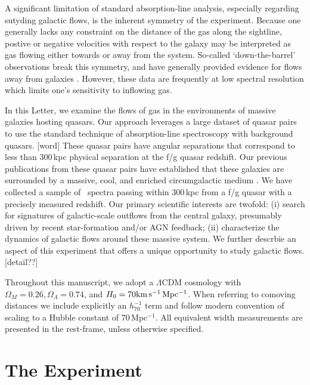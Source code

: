 \documentclass[12pt,preprint]{aastex}
\begin{document}
A significant limitation of standard absorption-line
analysis, especially regarding sutyding galactic flows,
is the inherent symmetry of the experiment.
Because one generally lacks any constraint on the distance
of the gas along the sightline,
postive or negative velocities with respect to the
galaxy may be interpreted as gas flowing either towards
or away from the system.
So-called `down-the-barrel' observations break this
symmetry, and have generally provided evidence for flows
away from galaxies \citep{rupke,martin,weiner,rubin}.
However, these data are frequently at low spectral resolution
which limits one's sensitivity to inflowing gas.

In this Letter, we examine the flows of gas in the environments
of massive galaxies hosting quasars.  Our approach leverages
a large dataset of quasar pairs \citep{hennawi}
to use the standard technique of absorption-line spectroscopy
with background quasars. [word]
These quasar pairs have angular
separations that correspond to less than 300\,kpc physical
separation at the f/g quasar redshift.
Our previous publications from these quasar pairs
have established that these galaxies are surrounded
by a massive, cool, and enriched circumgalactic medium
\citep{QPQ1,QPQ5,QPQ6,QPQ7}.
We have collected a sample of \ntot~spectra passing within
300\,kpc from a f/g quasar with a precisely measured
redshift.  Our primary scientific interests are twofold:
(i) search for signatures of galactic-scale outflows from the
central galaxy, presumably driven by recent star-formation
and/or AGN feedback;
(ii) characterize the dynamics of galactic flows around these
massive system.  We further descrbie an aspect of this
experiment that offers a unique opportunity to study galactic
flows. [detail??]

Throughout this manuscript, we adopt a $\Lambda$CDM cosmology with
$\Omega_M = 0.26, \Omega_\Lambda = 0.74$, and $H_0 = 70 {\rm km \,
  s^{-1} \, Mpc^{-1}}$.  When referring to comoving distances we include 
explicitly an $h_{70}^{-1}$ term and follow modern convention of scaling
to a Hubble constant of 70\kms\,Mpc$^{-1}$.  All equivalent width measurements are
presented in the rest-frame, unless otherwise specified.

 
\section{The Experiment}
\label{sec:data}
\end{document}

